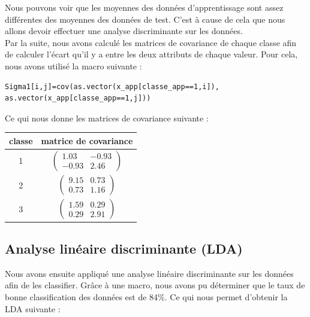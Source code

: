\documentclass[a4paper,11pt]{article}
\begin{document}
  Nous pouvons voir que les moyennes des données d'apprentissage sont assez différentes des moyennes
  des données de test. C'est à cause de cela que nous allons devoir effectuer une analyse discriminante
  sur les données.\\
  
  Par la suite, nous avons calculé les matrices de covariance de chaque classe afin de calculer l'écart
  qu'il y a entre les deux attributs de chaque valeur. Pour cela, nous avons utilisé la macro suivante :
  
  \begin{lstlisting}[caption=Calcul de covariance de la classe d'apprentissage 1]
  Sigma1[i,j]=cov(as.vector(x_app[classe_app==1,i]), as.vector(x_app[classe_app==1,j]))
  \end{lstlisting}
  
  Ce qui nous donne les matrices de covariance suivante : 
  \begin{center}
    \begin{tabular}{|c|c|}
    \hline
    classe & matrice de covariance\\
    \hline
    1 & 
    $\begin{pmatrix}
     1.03 & -0.93\\
     -0.93 & 2.46
    \end{pmatrix}$\\
    \hline
    2 & 
    $\begin{pmatrix}
     9.15 & 0.73\\
     0.73 & 1.16
    \end{pmatrix}$\\
    \hline
    3 & 
    $\begin{pmatrix}
     1.59 & 0.29\\
     0.29 & 2.91
    \end{pmatrix}$\\
    \hline
    \end{tabular}
  \end{center}
  
  \subsection{Analyse linéaire discriminante (LDA)}
  
  Nous avons ensuite appliqué une analyse linéaire discriminante sur les données afin de les 
  classifier. Grâce à une macro, nous avons pu déterminer que le taux de
  bonne classification des données est de 84\%. Ce qui nous permet d'obtenir la LDA suivante :\\
  
\end{document}
